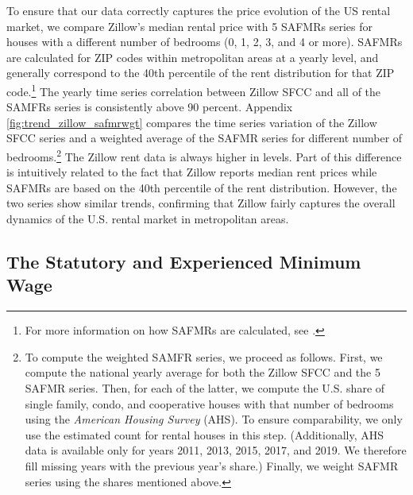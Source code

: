 To ensure that our data correctly captures the price evolution of the US rental market, 
we compare Zillow's median rental price with 5 SAFMRs series for houses with a different 
number of bedrooms (0, 1, 2, 3, and 4 or more). SAFMRs are calculated for ZIP codes within 
metropolitan areas at a yearly level, and generally correspond to the 40th percentile of 
the rent distribution for that ZIP code.\footnote{For more information on how SAFMRs are 
	calculated, see \textcite[][page 41641]{hudPreamble}.} 
The yearly time series correlation between Zillow SFCC and all of the SAMFRs series is 
consistently above 90 percent. Appendix \autoref{fig:trend_zillow_safmrwgt} 
compares the time series variation of the Zillow SFCC series and a weighted average of 
the SAFMR series for different number of bedrooms.\footnote{
	\label{foot:zillow_time_series}
	To compute the weighted SAMFR series, we proceed as follows. First, we compute the 
	national yearly average for both the Zillow SFCC and the 5 	SAFMR series. Then, for 
	each of the latter, we compute the U.S. share of single family, condo, and cooperative 
	houses with that number of bedrooms using the \textit{American Housing Survey} (AHS). 
	To ensure comparability, we only use the estimated count for rental houses in this 
	step. (Additionally, AHS data is available only for years 2011, 2013, 2015, 2017, and 
	2019. We therefore fill missing years with the previous year's share.) Finally, we 
	weight SAFMR series using the shares mentioned above.} 
The Zillow rent data is always higher in levels. Part of this difference is intuitively 
related to the fact that Zillow reports median rent prices while SAFMRs are based on the 
40th percentile of the rent distribution. However, the two series show similar trends, 
confirming that Zillow fairly captures the overall dynamics of the U.S. rental 
market in metropolitan areas.

\subsection{The Statutory and Experienced Minimum Wage}\label{sec:mw_construction}

